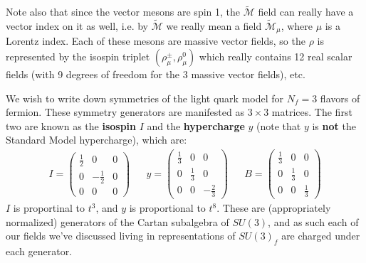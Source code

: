 \documentclass[11pt, oneside]{article}   	%
\theoremstyle{definition}
\numberwithin{equation}{subsection}		%
\begin{document}
Note also that since the vector mesons are spin 1, the $\tilde{\mathcal{M}}$ field can really have a vector index on it as well, i.e. by 
$\tilde{\mathcal{M}}$ we really mean a field $\tilde{\mathcal{M}}_\mu$, where $\mu$ is a Lorentz index. Each of these mesons are massive 
vector fields, so the $\rho$ is represented by the isospin triplet $(\rho_\mu^\pm, \rho_\mu^0)$ which really contains 12 real scalar fields (with 
9 degrees of freedom for the 3 massive vector fields), etc.

We wish to write down symmetries of the light quark model for $N_f = 3$ flavors of fermion. These symmetry generators are manifested 
as $3\times 3$ matrices. The first two are known as the \textbf{isospin} $I$ and the \textbf{hypercharge} $y$ (note that $y$ is \textbf{not} the 
Standard Model hypercharge), which are:
\begin{align}
	I = \begin{pmatrix} \frac{1}{2} & 0 & 0 \\ 0 & -\frac{1}{2} & 0 \\ 0 & 0 & 0\end{pmatrix} &&
	y = \begin{pmatrix} \frac{1}{3} & 0 & 0 \\ 0 & \frac{1}{3} & 0 \\ 0 & 0 & -\frac{2}{3} \end{pmatrix} && 
	B = \begin{pmatrix} \frac{1}{3} & 0 & 0 \\ 0 & \frac{1}{3} & 0 \\ 0 & 0 & \frac{1}{3} \end{pmatrix}
\end{align}
$I$ is proportinal to $t^3$, and $y$ is proportional to $t^8$. These are (appropriately normalized) generators of the Cartan subalgebra 
of $SU(3)$, and as such each of our fields we've discussed living in representations of $SU(3)_f$ are charged under each generator. 
\end{document}
